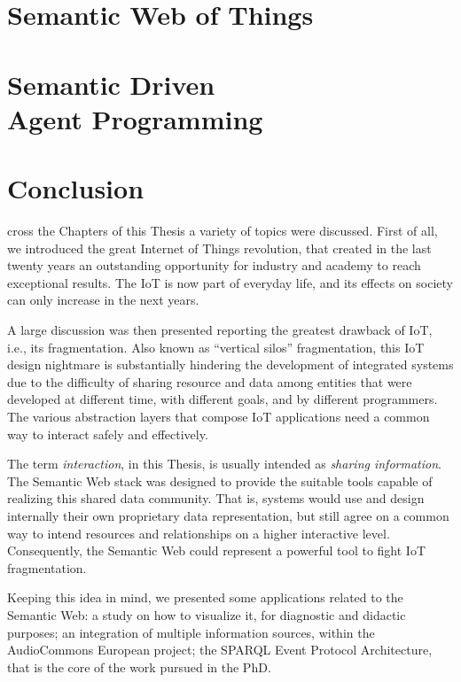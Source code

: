 \documentclass[11pt, twoside, openright]{report}   	%
\newcommand{\headletter}[1]{\lettrine[findent=2pt]{\fbox{\textbf{#1}}}{}}
\begin{document}
\chapter{Semantic Web of Things}
\label{ch:semantic_wot}

\clearpage

\chapter[Semantic Driven Agent Programming]{Semantic Driven\\Agent Programming}
\label{ch:semantic_agent}

\clearpage

\chapter*{Conclusion}
\headletter{A}
cross the Chapters of this Thesis a variety of topics were discussed. First of all, we introduced the great Internet of Things revolution, that created in the last twenty years an outstanding opportunity for industry and academy to reach exceptional results. The IoT is now part of everyday life, and its effects on society can only increase in the next years.

A large discussion was then presented reporting the greatest drawback of IoT, i.e., its fragmentation. Also known as ``vertical silos'' fragmentation, this IoT design nightmare is substantially hindering the development of integrated systems due to the difficulty of sharing resource and data among entities that were developed at different time, with different goals, and by different programmers. The various abstraction layers that compose IoT applications need a common way to interact safely and effectively.

The term \textit{interaction}, in this Thesis, is usually intended as \textit{sharing information}. The Semantic Web stack was designed to provide the suitable tools capable of realizing this shared data community. That is, systems would use and design internally their own proprietary data representation, but still agree on a common way to intend resources and relationships on a higher interactive level. Consequently, the Semantic Web could represent a powerful tool to fight IoT fragmentation.

Keeping this idea in mind, we presented some applications related to the Semantic Web: a study on how to visualize it, for diagnostic and didactic purposes; an integration of multiple information sources, within the AudioCommons European project; the SPARQL Event Protocol Architecture, that is the core of the work pursued in the PhD.
\end{document}
